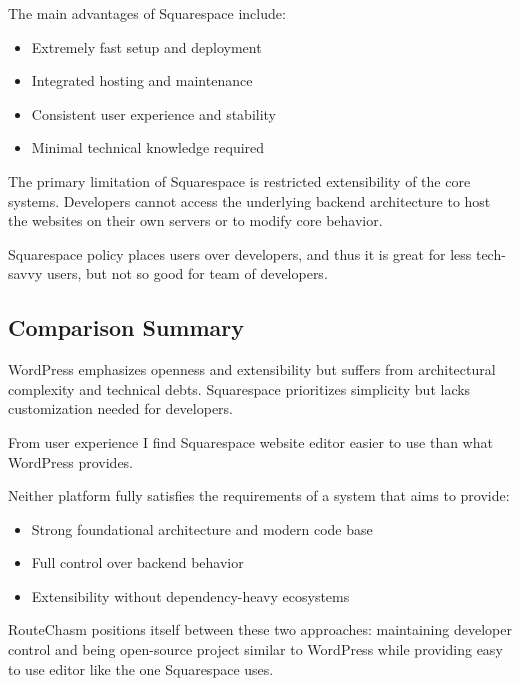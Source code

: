 The main advantages of Squarespace include:

\begin{itemize}
    \item Extremely fast setup and deployment
    \item Integrated hosting and maintenance
    \item Consistent user experience and stability
    \item Minimal technical knowledge required
\end{itemize}

The primary limitation of Squarespace is restricted extensibility of the core systems.
Developers cannot access the underlying backend architecture to host the websites on their own servers or to modify
core behavior.

Squarespace policy places users over developers, and thus it is great for less tech-savvy users, but not so good for
team of developers.

\subsection{Comparison Summary}\label{subsec:comparison-summary}
WordPress emphasizes openness and extensibility but suffers from architectural complexity and technical debts.
Squarespace prioritizes simplicity but lacks customization needed for developers.

From user experience I find Squarespace website editor easier to use than what WordPress provides.

Neither platform fully satisfies the requirements of a system that aims to provide:

\begin{itemize}
    \item Strong foundational architecture and modern code base
    \item Full control over backend behavior
    \item Extensibility without dependency-heavy ecosystems
\end{itemize}

RouteChasm positions itself between these two approaches:
maintaining developer control and being open-source project similar to WordPress
while providing easy to use editor like the one Squarespace uses.
